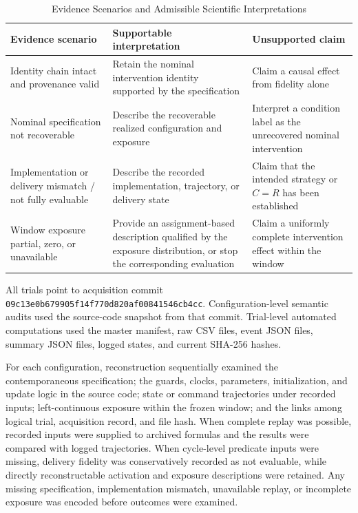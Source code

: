 \documentclass[journal]{IEEEtran}
\begin{document}
\begin{table}[t]
\caption{Evidence Scenarios and Admissible Scientific Interpretations}
\label{tab:interpretation}
\centering
\scriptsize
\begin{tabularx}{\textwidth}{@{}p{}Y Y@{}}
\toprule
Evidence scenario & Supportable interpretation & Unsupported claim \\
\midrule
Identity chain intact and provenance valid & Retain the nominal intervention identity supported by the specification & Claim a causal effect from fidelity alone \\
Nominal specification not recoverable & Describe the recoverable realized configuration and exposure & Interpret a condition label as the unrecovered nominal intervention \\
Implementation or delivery mismatch / not fully evaluable & Describe the recorded implementation, trajectory, or delivery state & Claim that the intended strategy or $C=R$ has been established \\
Window exposure partial, zero, or unavailable & Provide an assignment-based description qualified by the exposure distribution, or stop the corresponding evaluation & Claim a uniformly complete intervention effect within the window \\
\bottomrule
\end{tabularx}
\end{table}

All trials point to acquisition commit
\texttt{09c13e0b679905f14f770d820af00841546cb4cc}. Configuration-level semantic
audits used the source-code snapshot from that commit. Trial-level automated
computations used the master manifest, raw CSV files, event JSON files,
summary JSON files, logged states, and current SHA-256 hashes.

For each configuration, reconstruction sequentially examined the
contemporaneous specification; the guards, clocks, parameters, initialization,
and update logic in the source code; state or command trajectories under
recorded inputs; left-continuous exposure within the frozen window; and the
links among logical trial, acquisition record, and file hash. When complete
replay was possible, recorded inputs were supplied to archived formulas and
the results were compared with logged trajectories. When cycle-level
predicate inputs were missing, delivery fidelity was conservatively recorded
as not evaluable, while directly reconstructable activation and exposure
descriptions were retained. Any missing specification, implementation
mismatch, unavailable replay, or incomplete exposure was encoded before
outcomes were examined.
\end{document}
